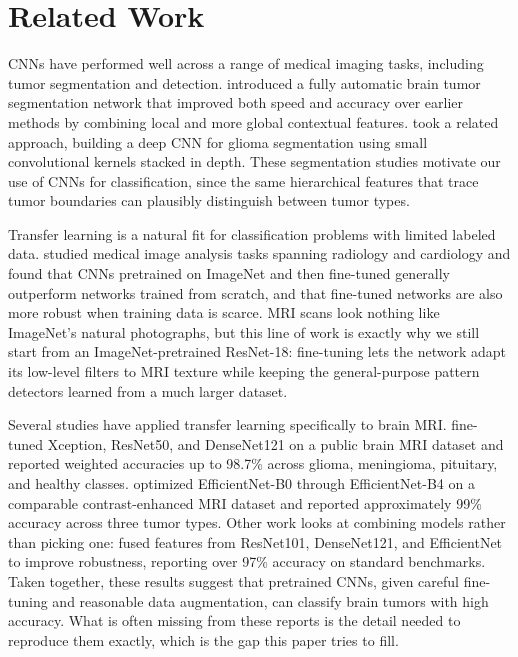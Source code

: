 \documentclass[twocolumn]{article}
\begin{document}
\section{Related Work}
CNNs have performed well across a range of medical imaging tasks, including tumor segmentation and detection. \citet{havaei2017brain} introduced a fully automatic brain tumor segmentation network that improved both speed and accuracy over earlier methods by combining local and more global contextual features. \citet{pereira2016brain} took a related approach, building a deep CNN for glioma segmentation using small convolutional kernels stacked in depth. These segmentation studies motivate our use of CNNs for classification, since the same hierarchical features that trace tumor boundaries can plausibly distinguish between tumor types.

Transfer learning is a natural fit for classification problems with limited labeled data. \citet{tajbakhsh2016convolutional} studied medical image analysis tasks spanning radiology and cardiology and found that CNNs pretrained on ImageNet and then fine-tuned generally outperform networks trained from scratch, and that fine-tuned networks are also more robust when training data is scarce. MRI scans look nothing like ImageNet's natural photographs, but this line of work is exactly why we still start from an ImageNet-pretrained ResNet-18: fine-tuning lets the network adapt its low-level filters to MRI texture while keeping the general-purpose pattern detectors learned from a much larger dataset.

Several studies have applied transfer learning specifically to brain MRI. \citet{disci2023fine} fine-tuned Xception, ResNet50, and DenseNet121 on a public brain MRI dataset and reported weighted accuracies up to 98.7\% across glioma, meningioma, pituitary, and healthy classes. \citet{vimala2023efficientnet} optimized EfficientNet-B0 through EfficientNet-B4 on a comparable contrast-enhanced MRI dataset and reported approximately 99\% accuracy across three tumor types. Other work looks at combining models rather than picking one: \citet{chen2024fusion} fused features from ResNet101, DenseNet121, and EfficientNet to improve robustness, reporting over 97\% accuracy on standard benchmarks. Taken together, these results suggest that pretrained CNNs, given careful fine-tuning and reasonable data augmentation, can classify brain tumors with high accuracy. What is often missing from these reports is the detail needed to reproduce them exactly, which is the gap this paper tries to fill.
\end{document}
